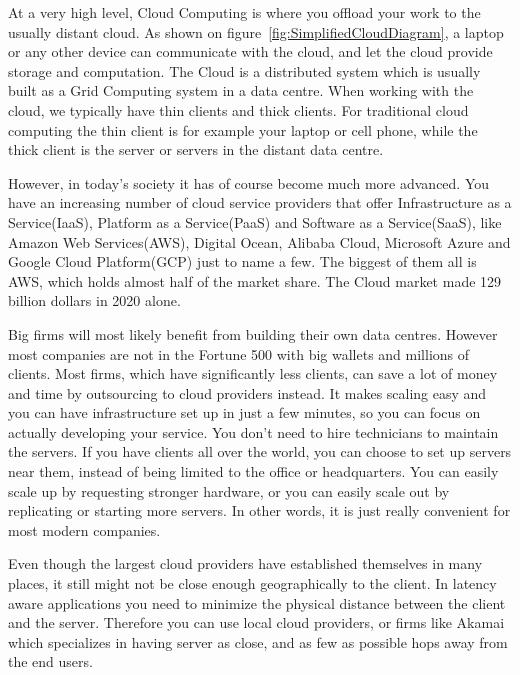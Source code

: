 At a very high level, Cloud Computing is where you offload your work to the usually distant cloud. As shown on figure~\ref{fig:SimplifiedCloudDiagram}, a laptop or any other device can communicate with the cloud, and let the cloud provide storage and computation. The Cloud is a distributed system which is usually built as a Grid Computing system in a data centre. When working with the cloud, we typically have thin clients and thick clients. For traditional cloud computing the thin client is for example your laptop or cell phone, while the thick client is the server or servers in the distant data centre.

However, in today's society it has of course become much more advanced. You have an increasing number of cloud service providers that offer Infrastructure as a Service(IaaS), Platform as a Service(PaaS) and Software as a Service(SaaS), like Amazon Web Services(AWS), Digital Ocean, Alibaba Cloud, Microsoft Azure and Google Cloud Platform(GCP) just to name a few. The biggest of them all is AWS, which holds almost half of the market share\cite{noauthor_cloud_2019}. The Cloud market made 129 billion dollars in 2020 alone\cite{noauthor_cloud_nodate}.

Big firms will most likely benefit from building their own data centres. However most companies are not in the Fortune 500 with big wallets and millions of clients. Most firms, which have significantly less clients, can save a lot of money and time by outsourcing to cloud providers instead. It makes scaling easy and you can have infrastructure set up in just a few minutes, so you can focus on actually developing your service. You don't need to hire technicians to maintain the servers. If you have clients all over the world, you can choose to set up servers near them, instead of being limited to the office or headquarters. You can easily scale up by requesting stronger hardware, or you can easily scale out by replicating or starting more servers. In other words, it is just really convenient for most modern companies.

Even though the largest cloud providers have established themselves in many places, it still might not be close enough geographically to the client. In latency aware applications you need to minimize the physical distance between the client and the server. Therefore you can use local cloud providers, or firms like Akamai which specializes in having server as close, and as few as possible hops away from the end users.





